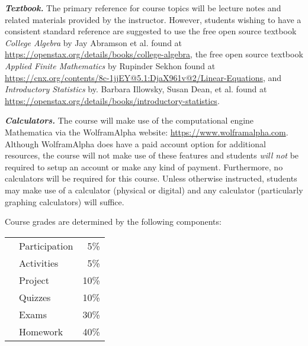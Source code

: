 \documentclass[11pt,letterpaper]{article}
\begin{document}
{\itshape\bfseries\color{stacred}Textbook.} The primary reference for course topics will be lecture notes and related materials provided by the instructor. However, students wishing to have a consistent standard reference are suggested to use the free open source textbook \textit{College Algebra} by Jay Abramson et al. found at \url{https://openstax.org/details/books/college-algebra}, the free open source textbook \textit{Applied Finite Mathematics} by Rupinder Sekhon found at \url{https://cnx.org/contents/8c-1jjEY@5.1:DjaX961v@2/Linear-Equations}, and \textit{Introductory Statistics} by. Barbara Illowsky, Susan Dean, et al. found at \href{https://openstax.org/details/books/introductory-statistics}{https://openstax.org/details/books/introductory-statistics}. \pspace

{\itshape\bfseries\color{stacred}Calculators.} The course will make use of the computational engine Mathematica via the WolframAlpha website: \url{https://www.wolframalpha.com}. Although WolframAlpha does have a paid account option for additional resources, the course will not make use of these features and students {\itshape will not} be required to setup an account or make any kind of payment. Furthermore, no calculators will be required for this course. Unless otherwise instructed, students may make use of a calculator (physical or digital) and any calculator (particularly graphing calculators) will suffice. 
\sectionbreak









Course grades are determined by the following components: \par
	\begin{table}[!ht]
        \begin{tabular}{clr}
	& Participation & 5\% \\
        & Activities & 5\% \\
	& Project & 10\% \\
	& Quizzes & 10\% \\
	& Exams & 30\% \\
	& Homework & 40\% 
        \end{tabular} 
        \end{table}
\sectionbreak
\end{document}
